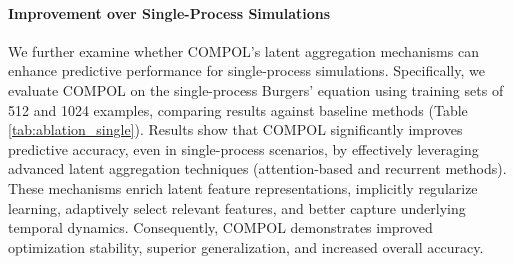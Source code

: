 \paragraph{Improvement over Single-Process Simulations}
We further examine whether COMPOL’s latent aggregation mechanisms can enhance predictive performance for single-process simulations. Specifically, we evaluate COMPOL on the single-process Burgers’ equation using training sets of 512 and 1024 examples, comparing results against baseline methods (Table \ref{tab:ablation_single}). Results show that COMPOL significantly improves predictive accuracy, even in single-process scenarios, by effectively leveraging advanced latent aggregation techniques (attention-based and recurrent methods). These mechanisms enrich latent feature representations, implicitly regularize learning, adaptively select relevant features, and better capture underlying temporal dynamics. Consequently, COMPOL demonstrates improved optimization stability, superior generalization, and increased overall accuracy.








